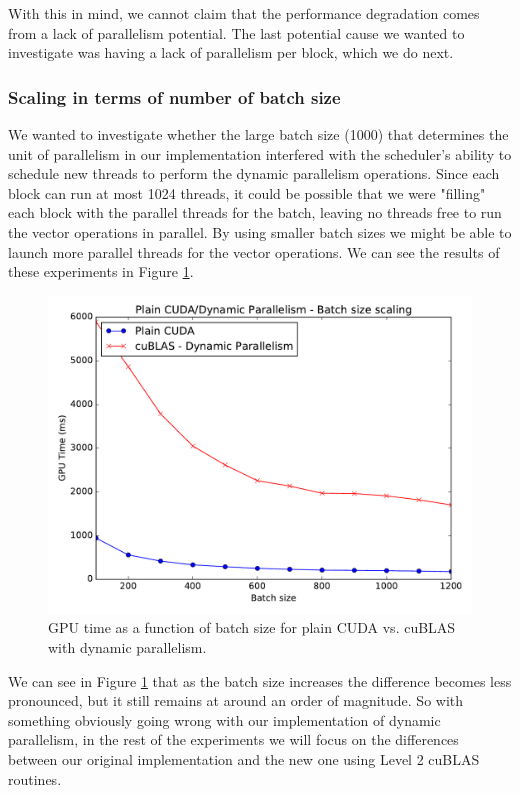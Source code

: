 \documentclass[11pt,a4paper]{article}
\begin{document}
With this in mind, we cannot claim that the performance degradation comes from a lack of parallelism
potential. The last potential cause we wanted to investigate was having a lack of parallelism
per block, which we do next.

\subsubsection*{Scaling in terms of number of batch size}

We wanted to investigate whether the large batch size (1000) that determines the unit
of parallelism in our implementation interfered with the scheduler's ability to schedule
new threads to perform the dynamic parallelism operations. Since each block can run at most 1024 threads,
it could be possible that we were "filling" each block with the parallel threads for the batch, leaving
no threads free to run the vector operations in parallel. By using smaller batch sizes we might be able
to launch more parallel threads for the vector operations. We can see the results of these experiments
in Figure \ref{fig:plain-dpar-batch-size}.

\begin{figure}[H]
	\centering
	\includegraphics[width=0.8\linewidth]{gpu_plain_vs_Lvl1cuBLAS-100b-1200b.pdf}
	\caption{GPU time as a function of batch size for plain CUDA vs. cuBLAS with dynamic parallelism.}
	\label{fig:plain-dpar-batch-size}
\end{figure}

We can see in Figure \ref{fig:plain-dpar-batch-size} that as the batch size increases the difference becomes less pronounced,
but it still remains at around an order of magnitude. So with something obviously going wrong with
our implementation of dynamic parallelism, in the rest of the experiments we will focus on the differences
between our original implementation and the new one using Level 2 cuBLAS routines.
\end{document}
